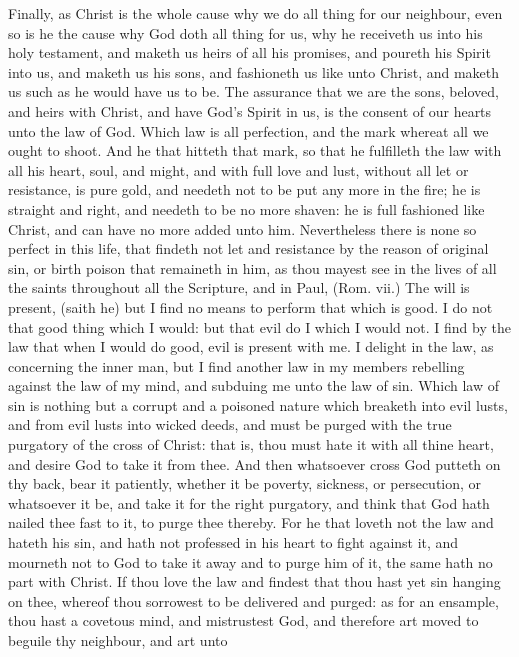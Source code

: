 Finally, as Christ is the whole cause why we do all 
thing for our neighbour, even so is he the cause why God 
doth all thing for us, why he receiveth us into his holy 
testament, and maketh us heirs of all his promises, and 
poureth his Spirit into us, and maketh us his sons, and 
fashioneth us like unto Christ, and maketh us such as he 
would have us to be. The assurance that we are the sons, 
beloved, and heirs with Christ, and have God's Spirit in 
us, is the consent of our hearts unto the law of God. 
Which law is all perfection, and the mark whereat all we 
ought to shoot. And he that hitteth that mark, so that 
he fulfilleth the law with all his heart, soul, and might, and 
with full love and lust, without all let or resistance, is pure 
gold, and needeth not to be put any more in the fire; he is 
straight and right, and needeth to be no more shaven: he 
is full fashioned like Christ, and can have no more added 
unto him. Nevertheless there is none so perfect in this 
life, that findeth not let and resistance by the reason of original
sin, or birth poison that remaineth in him, as thou 
mayest see in the lives of all the saints throughout all the 
Scripture, and in Paul, (Rom. vii.) The will is present, 
(saith he) but I find no means to perform that which is 
good. I do not that good thing which I would: but that 
evil do I which I would not. I find by the law that when 
I would do good, evil is present with me. I delight in the 
law, as concerning the inner man, but I find another law 
in my members rebelling against the law of my mind, and 
subduing me unto the law of sin. Which law of sin is 
nothing but a corrupt and a poisoned nature which breaketh
into evil lusts, and from evil lusts into wicked deeds, and 
must be purged with the true purgatory of the cross of 
Christ: that is, thou must hate it with all thine heart, and 
desire God to take it from thee. And then whatsoever 
cross God putteth on thy back, bear it patiently, whether 
it be poverty, sickness, or persecution, or whatsoever it be, 
and take it for the right purgatory, and think that God 
hath nailed thee fast to it, to purge thee thereby. For he 
that loveth not the law and hateth his sin, and hath not 
professed in his heart to fight against it, and mourneth not 
to God to take it away and to purge him of it, the same 
hath no part with Christ. If thou love the law and findest
that thou hast yet sin hanging on thee, whereof thou 
sorrowest to be delivered and purged: as for an ensample, 
thou hast a covetous mind, and mistrustest God, and 
therefore art moved to beguile thy neighbour, and art unto 
